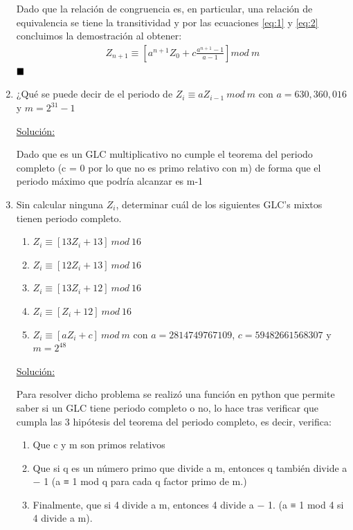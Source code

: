 \documentclass[12 pt]{article}\usepackage[]{graphicx}\usepackage[]{color}
\renewcommand\qedsymbol{$\null\hfill\blacksquare$}
\begin{document}
\begin{enumerate}
    Dado que la relación de congruencia es, en particular, una relación de equivalencia se tiene la transitividad y por las ecuaciones \eqref{eq:1} y \eqref{eq:2} concluimos la demostración al obtener:
    \begin{align*}
        Z_{n+1} \equiv \left[a^{n+1}Z_0 + c\frac{a^{n+1} - 1}{a - 1} \right] mod \ m 
    \end{align*} 
    \qedsymbol
    
    \newpage
    
    \item¿Qué se puede decir de el periodo de $Z_i \equiv aZ_{i-1}\ mod \ m$  con $a = 630,360,016$ y $m = 2^{31} -1$
    
    \underline{Solución:}
    
    Dado que es un GLC multiplicativo no cumple el teorema del periodo completo (c = 0 por lo que no es primo relativo con m) de forma que el periodo máximo que podría alcanzar es m-1
    
    \newpage
    
    \item Sin calcular ninguna $Z_i$, determinar cuál de los siguientes GLC’s mixtos tienen periodo completo.
    
    \begin{enumerate}[label=(\alph*)]
        \item $Z_i \equiv [13Z_i + 13] \ mod \ 16$
        \item $Z_i \equiv [12Z_i + 13] \ mod \ 16$
        \item $Z_i \equiv [13Z_i + 12] \ mod \ 16$
        \item $Z_i \equiv [Z_i + 12] \ mod \ 16$
        \item $Z_i \equiv [aZ_i + c] \ mod \ m$ con $a = 2814749767109$, $c = 59482661568307$ y $m =2^{48}$
        
    \end{enumerate}
    
    \underline{Solución:}
    
    Para resolver dicho problema se realizó una función en python que permite saber si un GLC tiene periodo completo o no, lo hace tras verificar que cumpla las 3 hipótesis del teorema del periodo completo, es decir, verifica:
    
    \begin{enumerate}
        \item Que c y m son primos relativos
        \item Que si q es un número primo que divide a m, entonces q también divide a − 1 (a ≡ 1
              mod q para cada q factor primo de m.)
        \item Finalmente, que si 4 divide a m, entonces 4 divide a − 1. (a ≡ 1 mod 4 si 4 divide a m).
    \end{enumerate}   


\end{enumerate}
\end{document}
